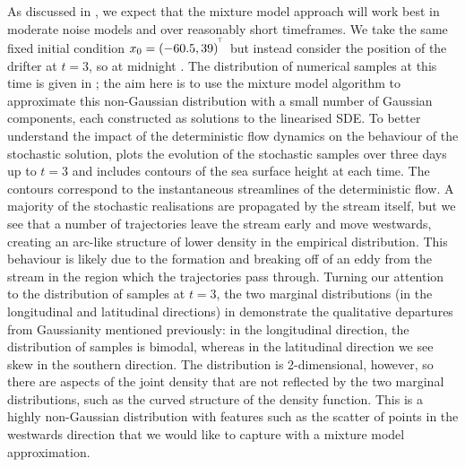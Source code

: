 As discussed in , we expect that the mixture model approach will work best in moderate noise models and over reasonably short timeframes.
We take the same fixed initial condition \(x_0 = \left(-60.5, 39\right)^{^{\!\top}}\) but instead consider the position of the drifter at \(t = 3\), so at midnight .
The distribution of numerical samples at this time is given in ; the aim here is to use the mixture model algorithm to approximate this non-Gaussian distribution with a small number of Gaussian components, each constructed as solutions to the linearised SDE.
To better understand the impact of the deterministic flow dynamics on the behaviour of the stochastic solution,  plots the evolution of the stochastic samples over three days up to \(t = 3\) and includes contours of the sea surface height at each time.
The contours correspond to the instantaneous streamlines of the deterministic flow.
A majority of the stochastic realisations are propagated by the stream itself, but we see that a number of trajectories leave the stream early and move westwards, creating an arc-like structure of lower density in the empirical distribution.
This behaviour is likely due to the formation and breaking off of an eddy from the stream in the region which the trajectories pass through.
Turning our attention to the distribution of samples at \(t = 3\), the two marginal distributions (in the longitudinal and latitudinal directions) in  demonstrate the qualitative departures from Gaussianity mentioned previously: in the longitudinal direction, the distribution of samples is bimodal, whereas in the latitudinal direction we see skew in the southern direction.
The distribution is 2-dimensional, however, so there are aspects of the joint density that are not reflected by the two marginal distributions, such as the curved structure of the density function.
This is a highly non-Gaussian distribution with features such as the scatter of points in the westwards direction that we would like to capture with a mixture model approximation.

